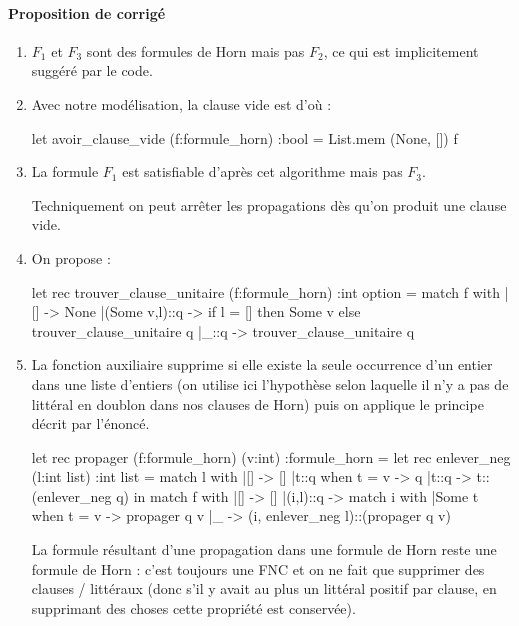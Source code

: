 \documentclass{ccinp}
\begin{document}
\paragraph*{Proposition de corrigé}

  \begin{enumerate}
      \item $F_1$ et $F_3$ sont des formules de Horn mais pas $F_2$, ce qui est implicitement suggéré par le code.
  \item Avec notre modélisation, la clause vide est  d'où :
  \begin{ocode}
    let avoir_clause_vide (f:formule_horn) :bool = 
      List.mem (None, []) f
    \end{ocode}
  
  \item La formule $F_1$ est satisfiable d'après cet algorithme mais pas $F_3$.
  
  Techniquement on peut arrêter les propagations dès qu'on produit une clause vide. 
  
  \item On propose : \begin{ocode}
let rec trouver_clause_unitaire (f:formule_horn) :int option = match f with
  |[] -> None
  |(Some v,l)::q -> if l = [] then Some v else trouver_clause_unitaire q
  |_::q -> trouver_clause_unitaire q
  \end{ocode}
    
  \item La fonction auxiliaire  supprime si elle existe la seule occurrence d'un entier dans une liste d'entiers (on utilise ici l'hypothèse selon laquelle il n'y a pas de littéral en doublon dans nos clauses de Horn) puis on applique le principe décrit par l'énoncé.
  
  \newpage
  
  \begin{ocode}
let rec propager (f:formule_horn) (v:int) :formule_horn =
  let rec enlever_neg (l:int list) :int list = match l with
    |[] -> []
    |t::q when t = v -> q
    |t::q -> t::(enlever_neg q)
  in
  match f with
  |[] -> []
  |(i,l)::q -> match i with
                 |Some t when t = v -> propager q v
                 |_ -> (i, enlever_neg l)::(propager q v)
  \end{ocode}
   

  La formule résultant d'une propagation dans une formule de Horn reste une formule de Horn : c'est toujours une FNC et on ne fait que supprimer des clauses / littéraux (donc s'il y avait au plus un littéral positif par clause, en supprimant des choses cette propriété est conservée).
  

\end{enumerate}
\end{document}
